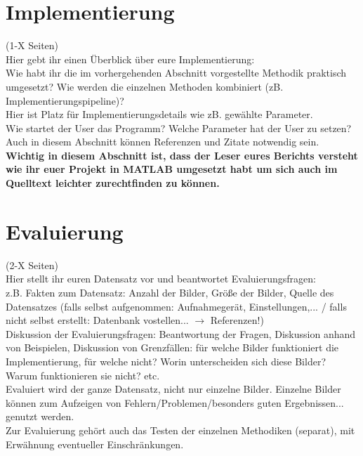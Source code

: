 \documentclass[paper=A4, deutsch]{scrartcl}
\begin{document}
\section{Implementierung}
(1-X Seiten)\\
Hier gebt ihr einen Überblick über eure Implementierung:\\
Wie habt ihr die im vorhergehenden Abschnitt vorgestellte Methodik praktisch umgesetzt? Wie werden die einzelnen Methoden kombiniert (zB. Implementierungspipeline)?\\
Hier ist Platz für Implementierungsdetails wie zB. gewählte Parameter. \\
Wie startet der User das Programm? Welche Parameter hat der User zu setzen?\\
Auch in diesem Abschnitt können Referenzen und Zitate notwendig sein.\\
\textbf{Wichtig in diesem Abschnitt ist, dass der Leser eures Berichts versteht wie ihr euer Projekt in MATLAB umgesetzt habt um sich auch im Quelltext leichter zurechtfinden zu können.}

\section{Evaluierung}
(2-X Seiten)\\
Hier stellt ihr euren Datensatz vor und beantwortet Evaluierungsfragen:\\
z.B. Fakten zum Datensatz: Anzahl der Bilder, Größe der Bilder, Quelle des Datensatzes (falls selbst aufgenommen: Aufnahmegerät, Einstellungen,... / falls nicht selbst erstellt: Datenbank vostellen... $\to$ Referenzen!)\\
Diskussion der Evaluierungsfragen: Beantwortung der Fragen, Diskussion anhand von Beispielen, Diskussion von Grenzfällen: für welche Bilder funktioniert die Implementierung, für welche nicht? Worin unterscheiden sich diese Bilder? Warum funktionieren sie nicht? etc.\\
Evaluiert wird der ganze Datensatz, nicht nur einzelne Bilder. Einzelne Bilder können zum Aufzeigen von Fehlern/Problemen/besonders guten Ergebnissen... genutzt werden.\\
Zur Evaluierung gehört auch das Testen der einzelnen Methodiken (separat), mit Erwähnung eventueller Einschränkungen.
\end{document}
